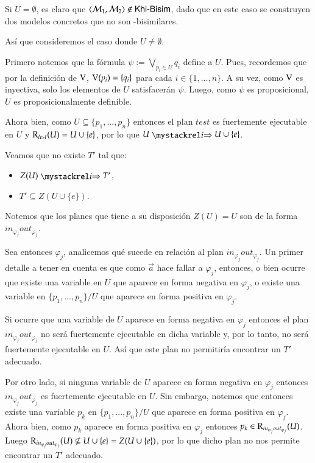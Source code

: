 \begin{demostracion}
\begin{itemize}
    Si $U = \emptyset$, es claro que $\langle \mathcal{M}_1,\mathcal{M}_2 \rangle \notin \rm\textsf{Khi-Bisim}$, dado que en este caso se construyen 
    dos modelos concretos que no son \KHilogic-bisimilares.

    Así que consideremos el caso donde $U \neq \emptyset$.
    
    Primero notemos que la fórmula $\psi := \bigvee\limits_{p_i \in U} q_i$ define a $U$. 
    Pues, recordemos que por la definición de $\mathrm{V}$, $\mathrm{V}(p_i) = \{q_i\}$ para cada $i \in \{1,...,n\}$. 
    A su vez, como $\mathrm{V}$ es inyectiva, solo los elementos de $U$ satisfacerán $\psi$. Luego, como $\psi$ es proposicional, 
    $U$ es proposicionalmente definible.

    Ahora bien, como $U \subseteq \{p_1,...,p_n\}$ entonces el plan $test$ es fuertemente ejecutable en $U$ y 
    $\mathrm{R}_{test}(U) = U \cup \{e\}$, por lo que $U \ultsExecAgi U \cup \{e\}$.
    
    Veamos que no existe $T'$ tal que:

    \begin{multicols}{2}
        \begin{itemize}
            \item $Z(U) \ultsExecAgi T'$, 
            \item $T' \subseteq Z(U \cup \{e\})$.
        \end{itemize}
    \end{multicols}

    Notemos que los planes que tiene a su disposición $Z(U) = U$ son de la forma $in_{\varphi_j}out_{\varphi_j}$.

    Sea entonces $\varphi_j$, analicemos qué sucede en relación al plan $in_{\varphi_j}out_{\varphi_j}$. 
    Un primer detalle a tener en cuenta es que como $\overrightarrow{a}$ hace fallar a $\varphi_j$, entonces, 
    o bien ocurre que existe una variable en $U$ que aparece en forma negativa en $\varphi_j$, 
    o existe una variable en $\{p_1,...,p_n\}/U$ que aparece en forma positiva en $\varphi_j$.

    Si ocurre que una variable de $U$ aparece en forma negativa en $\varphi_j$ entonces el plan 
    $in_{\varphi_j}out_{\varphi_j}$ no será fuertemente ejecutable en dicha variable y, por lo tanto, 
    no será fuertemente ejecutable en $U$. Así que este plan no permitiría encontrar un $T'$ adecuado.

    Por otro lado, si ninguna variable de $U$ aparece en forma negativa en $\varphi_j$ entonces 
    $in_{\varphi_j}out_{\varphi_j}$ es fuertemente ejecutable en $U$. Sin embargo, notemos que 
    entonces existe una variable $p_k$ en $\{p_1,...,p_n\}/U$ que aparece en forma positiva en $\varphi_j$. 
    Ahora bien, como $p_k$ aparece en forma positiva en $\varphi_j$ entonces $p_k \in \mathrm{R}_{in_{\varphi_j}out_{\varphi_j}}(U)$. 
    Luego $\mathrm{R}_{in_{\varphi_j}out_{\varphi_j}}(U) \not \subseteq U \cup \{e\} = Z(U \cup \{e\})$, por lo que dicho plan no nos 
    permite encontrar un $T'$ adecuado.
    

\end{itemize}
\end{demostracion}
